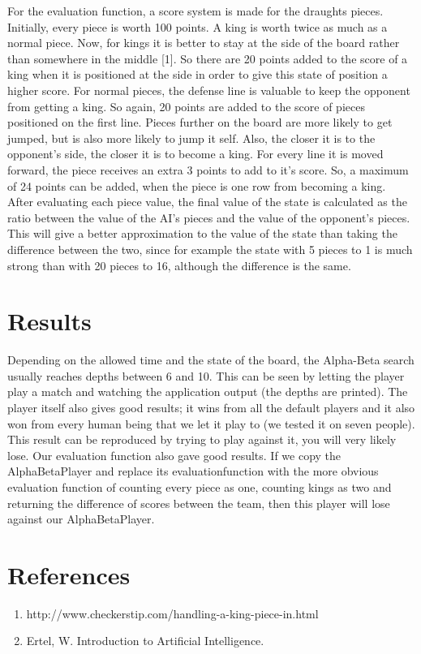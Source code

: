 \documentclass[a4paper,twoside,11pt]{article}
\begin{document}
For the evaluation function, a score system is made for the draughts pieces. Initially, every piece is worth 100 points. A king is worth twice as much as a normal piece. Now, for kings it is better to stay at the side of the board rather than somewhere in the middle [1]. So there are 20 points added to the score of a king when it is positioned at the side in order to give this state of position a higher score.
For normal pieces, the defense line is valuable to keep the opponent from getting a king. So again, 20 points are added to the score of pieces positioned on the first line. Pieces further on the board are more likely to get jumped, but is also more likely to jump it self. Also, the closer it is to the opponent's side, the closer it is to become a king. For every line it is moved forward, the piece receives an extra 3 points to add to it's score. So, a maximum of 24 points can be added, when the piece is one row from becoming a king.\\
After evaluating each piece value, the final value of the state is calculated as the ratio between the value of the AI's pieces and the value of the opponent's pieces. This will give a better approximation to the value of the state than taking the difference between the two, since for example the state with 5 pieces to 1 is much strong than with 20 pieces to 16, although the difference is the same. 

\section{Results}
Depending on the allowed time and the state of the board, the Alpha-Beta search usually reaches depths between 6 and 10. This can be seen by letting the player play a match and watching the application output (the depths are printed). The player itself also gives good results; it wins from all the default players and it also won from every human being that we let it play to (we tested it on seven people). This result can be reproduced by trying to play against it, you will very likely lose. Our evaluation function also gave good results. If we copy the AlphaBetaPlayer and replace its evaluationfunction with the more obvious evaluation function of counting every piece as one, counting kings as two and returning the difference of scores between the team, then this player will lose against our AlphaBetaPlayer.

\section{References}
\begin{enumerate}
\item http://www.checkerstip.com/handling-a-king-piece-in.html
\item Ertel, W. Introduction to Artificial Intelligence.
\end{enumerate}
\end{document}
